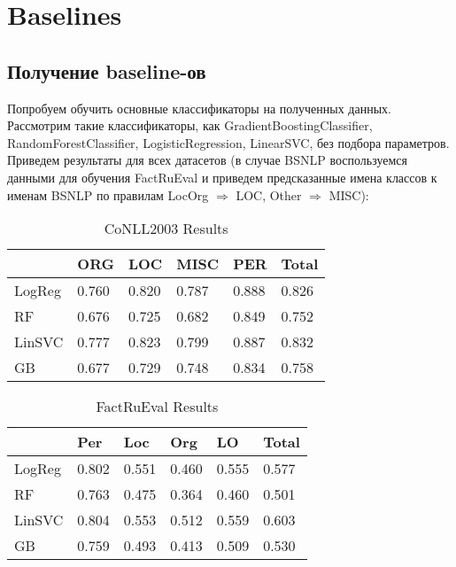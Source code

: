 \section{Baselines}
\subsection{Получение baseline-ов}

Попробуем обучить основные классификаторы на полученных данных. Рассмотрим такие классификаторы, как GradientBoostingClassifier, RandomForestClassifier, LogisticRegression, LinearSVC, без подбора параметров. Приведем результаты для всех датасетов (в случае BSNLP воспользуемся данными для обучения FactRuEval и приведем предсказанные имена классов к именам BSNLP по правилам LocOrg ${\Rightarrow}$ LOC, Other ${\Rightarrow}$ MISC):


\begin{table}[ht]
\centering
\caption{CoNLL2003 Results}
\label{conll2003}
\begin{tabular}{|l|l|l|l|l|l|}
\hline
            & ORG   & LOC   & MISC  & PER   & Total \\ \hline
LogReg      & 0.760 & 0.820 & 0.787 & 0.888 & 0.826 \\ \hline
RF          & 0.676 & 0.725 & 0.682 & 0.849 & 0.752 \\ \hline
LinSVC      & 0.777 & 0.823 & 0.799 & 0.887 & 0.832 \\ \hline
GB          & 0.677 & 0.729 & 0.748 & 0.834 & 0.758 \\ \hline
\end{tabular}
\end{table}



\begin{table}[ht]
\centering
\caption{FactRuEval Results}
\label{factrueval}
\begin{tabular}{|l|l|l|l|l|l|}
\hline
          & Per    &      Loc & Org   & LO     & Total \\ \hline
LogReg    & 0.802  & 0.551    & 0.460 & 0.555  & 0.577 \\ \hline
RF        & 0.763  & 0.475    & 0.364 & 0.460  & 0.501 \\ \hline
LinSVC    & 0.804  & 0.553    & 0.512 & 0.559  & 0.603 \\ \hline
GB        & 0.759  & 0.493    & 0.413 & 0.509  & 0.530 \\ \hline
\end{tabular}
\end{table}



